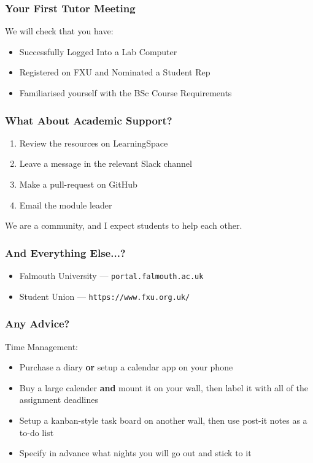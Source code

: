 \begin{frame}
	\frametitle{Your First Tutor Meeting}	
	
	We will check that you have:
	
	\begin{itemize}
	\item Successfully Logged Into a Lab Computer
	\item Registered on FXU and Nominated a Student Rep
	\item Familiarised yourself with the BSc Course Requirements
	\end{itemize}
\end{frame}

\begin{frame}
	\frametitle{What About Academic Support?}	
	\begin{enumerate}
		\item Review the resources on LearningSpace
		\item Leave a message in the relevant Slack channel
		\item Make a pull-request on GitHub
		\item Email the module leader
	\end{enumerate}
	
	We are a community, and I expect students to help each other.
\end{frame}

\begin{frame}
	\frametitle{And Everything Else...?}	
	\begin{itemize}
		\item Falmouth University --- \texttt{portal.falmouth.ac.uk}
		\item Student Union --- \texttt{https://www.fxu.org.uk/}
	\end{itemize}
\end{frame}

\begin{frame}
	\frametitle{Any Advice?}	
	
	Time Management:
	
	\begin{itemize}
		\item Purchase a diary \textbf{or} setup a calendar app on your phone
		\item Buy a large calender \textbf{and} mount it on your wall, then label it with all of the assignment deadlines
		\item Setup a kanban-style task board on another wall, then use post-it notes as a to-do list
		\item Specify in advance what nights you will go out and stick to it
	\end{itemize}
\end{frame}

